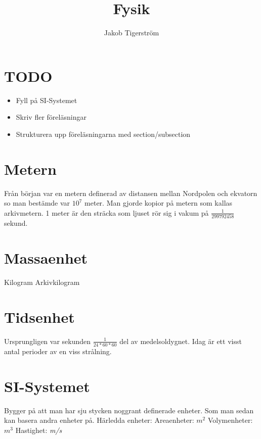 \documentclass[a4paper,11pt]{article}
\title{Fysik}
\author{Jakob Tigerström}
\begin{document}
\tableofcontents
\newpage
\begin{flushleft}
\section{TODO}
\begin{itemize}
  \item Fyll på SI-Systemet
  \item Skriv fler föreläsningar
  \item Strukturera upp föreläsningarna med section/subsection
\end{itemize}
\section{Metern}
Från början var en metern definerad av distansen mellan Nordpolen och ekvatorn so man bestämde var $ 10^7 $ meter.
Man gjorde kopior på metern som kallas arkivmetern.
1 meter är den sträcka som ljuset rör sig i vakum på $ \frac{1}{299792458} $ sekund.
\newline
\newline
\section{Massaenhet}
Kilogram
\newline
Arkivkilogram
\newline
\newline
\section{Tidsenhet}
Ursprungligen var sekunden $ \frac{1}{24*60*60} $ del av medelsoldygnet.
\newline
Idag är ett visst antal perioder av en viss strålning.
\newline
\newline
\section{SI-Systemet}
Bygger på att man har sju stycken noggrant definerade enheter. Som man sedan kan basera andra enheter på.
\newline
Härledda enheter:\newline
Areaenheter: $ m^2 $\newline
Volymenheter: $ m^3 $\newline
Hastighet:  \textit{m/s}\newline


\end{flushleft}
\end{document}

